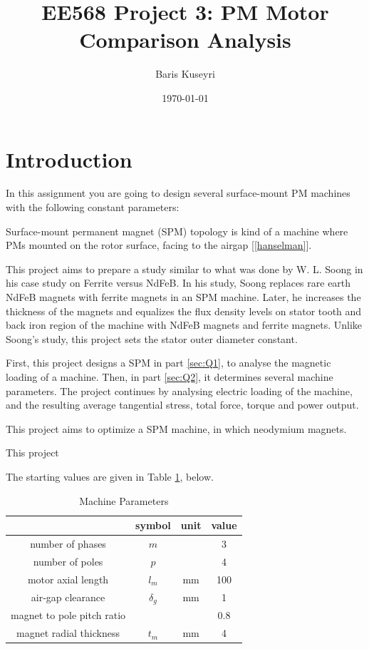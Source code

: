 \documentclass[a4paper, 11pt, titlepage]{article}
\begin{document}
\title{EE568 Project 3: PM Motor Comparison Analysis}
\author{Baris Kuseyri}
\date{\today}
\maketitle

\tableofcontents
\newpage

\section{Introduction}
\label{sec:intro}

In this assignment you are going to design several surface-mount PM machines with the following constant parameters:

Surface-mount permanent magnet (SPM) topology is kind of a machine where PMs mounted on the rotor surface, facing to the airgap [\ref{hanselman}].

This project aims to prepare a study similar to what was done by W. L. Soong in his case study on Ferrite versus NdFeB. In his study, Soong replaces rare earth NdFeB magnets with ferrite magnets in an SPM machine. Later, he increases the thickness of the magnets and equalizes the flux density levels on stator tooth and back iron region of the machine with NdFeB magnets and ferrite magnets. Unlike Soong's study, this project sets the stator outer diameter constant.

First, this project designs a SPM in part \ref{sec:Q1}, to analyse the magnetic loading of a machine. Then, in part \ref{sec:Q2}, it determines several machine parameters. The project continues by analysing electric loading of the machine, and the resulting average tangential stress, total force, torque and power output.


This project aims to optimize a SPM machine, in which neodymium magnets. 

This project 

The starting values are given in Table \ref{table:machineParameters}, below.

\begin{table}[ht]
	\begin{center}
		\begin{tabular}{c|c|c|c}
			 & symbol & unit & value \\
			\hline
			number of phases & $m$ & & 3 \\
			number of poles & $p$ & & 4 \\
			motor axial length & $l_m$ & mm & 100 \\ 
			air-gap clearance & $\delta_g$ & mm & 1 \\
			magnet to pole pitch ratio & & & 0.8 \\
			magnet radial thickness & $t_m$ & mm & 4 \\
			\hline
		\end{tabular}
	\end{center}
	\caption{Machine Parameters}
	\label{table:machineParameters}
\end{table}
	
\end{document}
